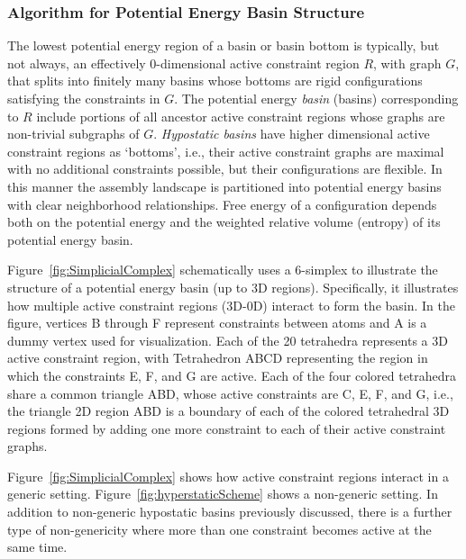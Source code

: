 \documentclass[]{article}
\newcommand{\figref}[1]{Figure~\ref{#1}}
\begin{document}
\subsubsection{Algorithm for Potential Energy Basin Structure}
\label{sec:methods:BasinStructure}
The lowest potential energy region of a basin or basin bottom is typically, but
not always, an effectively 0-dimensional active constraint region $R$, with
graph $G$, that splits into finitely many basins whose bottoms are rigid configurations 
satisfying the constraints in $G$. The potential
energy \emph{basin} (basins) corresponding to $R$ include portions of all ancestor active
constraint regions whose graphs are non-trivial subgraphs of $G$.
\emph{Hypostatic basins} have higher dimensional active constraint regions as
`bottoms', i.e., their active constraint graphs are maximal with no additional
constraints possible, but their configurations are flexible.  In this manner the
assembly landscape is partitioned into potential energy basins with clear
neighborhood relationships.  Free energy of a configuration depends both on the
potential energy and the weighted relative volume (entropy) of its potential
energy basin.

\figref{fig:SimplicialComplex} schematically uses a 6-simplex to illustrate the
structure of a potential energy basin (up to 3D regions). Specifically, it illustrates how
multiple active constraint regions (3D-0D) interact to form the basin. In the
figure, vertices B through F represent constraints between atoms and A is a
dummy vertex used for visualization. Each of the 20 tetrahedra represents a 3D
active constraint region, with Tetrahedron ABCD representing the region in
which the constraints E, F, and G are active. Each of the four colored
tetrahedra share a common triangle ABD, whose active constraints are C, E, F,
and G, i.e., the triangle 2D region ABD is a boundary of each of the colored
tetrahedral 3D regions formed by adding one more constraint to each of their
active constraint graphs.

\figref{fig:SimplicialComplex} shows how active constraint regions interact in
a generic setting. \figref{fig:hyperstaticScheme} shows a non-generic setting.
In addition to non-generic hypostatic basins previously discussed, there is a
further type of non-genericity where more than one
constraint becomes active at the same time. 
\end{document}
